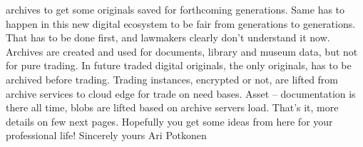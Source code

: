 archives to get some originals saved for forthcoming generations. Same has to happen in this new digital ecosystem to be fair from generations to generations. That has to be done first, and lawmakers clearly don't understand it now. Archives are created and used for documents, library and museum data, but not for pure trading. In future traded digital originals, the only originals, has to be archived before trading. Trading instances, encrypted or not, are lifted from archive services to cloud edge for trade on need bases. Asset -- documentation is there all time, blobs are lifted based on archive servers load. That's it, more details on few next pages. Hopefully you get some ideas from here for your professional life!
Sincerely yours Ari Potkonen
